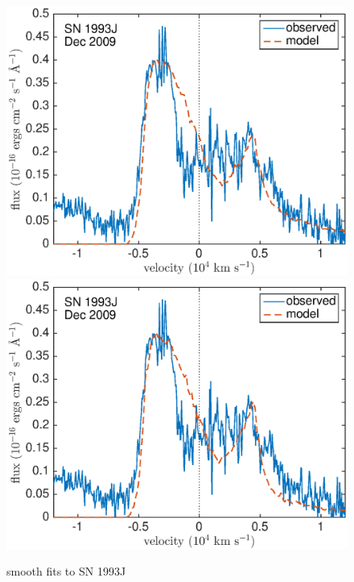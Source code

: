 \begin{figure}
\includegraphics[scale=0.4,clip=true, trim=20 0 40 20]{chapters/chapter6/figs/93J/smooth/OII}
\includegraphics[scale=0.4,clip=true, trim=20 0 40 20]{chapters/chapter6/figs/93J/smooth/OII_amC}
\caption{smooth fits to SN 1993J}
\label{93J_smooth}
\end{figure}

